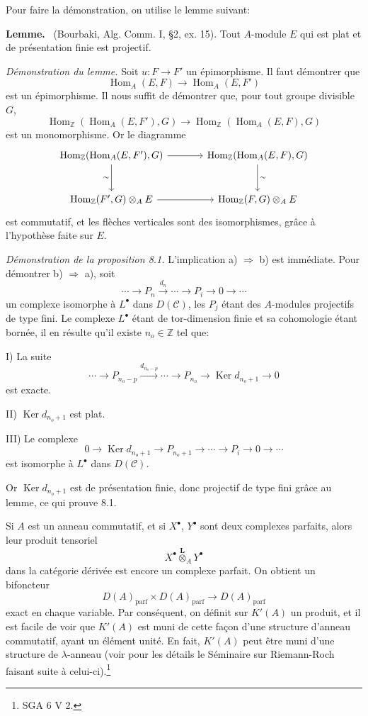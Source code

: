 \documentclass[11pt]{article}
\newenvironment{statement}[1]{\par\medskip\noindent\textbf{#1.}\ }{\par\medskip}
\DeclareMathOperator{\Hom}{Hom}
\providecommand{\Ker}{\operatorname{Ker}}
\providecommand{\parf}{\mathrm{parf}}
\providecommand{\Hom}{\operatorname{Hom}}
\providecommand{\cC}{\mathcal C}
\providecommand{\Ker}{\operatorname{Ker}}
\providecommand{\Ker}{\operatorname{Ker}}
\providecommand{\cC}{\mathcal C}
\providecommand{\parf}{\mathrm{parf}}
\providecommand{\Hom}{\operatorname{Hom}}
\begin{document}
Pour faire la démonstration, on utilise le lemme suivant:

\begin{statement}{Lemme}
(Bourbaki, Alg. Comm. I, §2, ex. 15). Tout $A$-module $E$ qui est plat et de présentation finie est projectif.
\end{statement}

\emph{Démonstration du lemme.} Soit $u:F\to F'$ un épimorphisme. Il faut démontrer que
\[
\Hom_A(E,F)\longrightarrow\Hom_A(E,F')
\]
est un épimorphisme. Il nous suffit de démontrer que, pour tout groupe divisible $G$,
\[
\Hom_{\mathbb Z}(\Hom_A(E,F'),G)\longrightarrow
\Hom_{\mathbb Z}(\Hom_A(E,F),G)
\]
est un monomorphisme. Or le diagramme
\[
\begin{tikzcd}[column sep=large,row sep=large]
\Hom_{\mathbb Z}(\Hom_A(E,F'),G)
 \arrow[r]\arrow[d,"\sim"']&
\Hom_{\mathbb Z}(\Hom_A(E,F),G)\arrow[d,"\sim"]\\
\Hom_{\mathbb Z}(F',G)\otimes_A E
 \arrow[r]&
\Hom_{\mathbb Z}(F,G)\otimes_A E
\end{tikzcd}
\]
est commutatif, et les flèches verticales sont des isomorphismes, grâce à l'hypothèse faite sur $E$.

\emph{Démonstration de la proposition 8.1.} L'implication a) $\Rightarrow$ b) est immédiate. Pour démontrer b) $\Rightarrow$ a), soit
\[
\cdots\longrightarrow P_n\xrightarrow{d_n}\cdots\longrightarrow P_i\longrightarrow 0\longrightarrow\cdots
\]
un complexe isomorphe à $L^\bullet$ dans $D(\cC)$, les $P_j$ étant des $A$-modules projectifs de type fini. Le complexe $L^\bullet$ étant de tor-dimension finie et sa cohomologie étant bornée, il en résulte qu'il existe $n_o\in\mathbb Z$ tel que:

I) La suite
\[
\cdots\longrightarrow P_{n_o-p}\xrightarrow{d_{n_o-p}}\cdots\longrightarrow
P_{n_o}\longrightarrow \Ker d_{n_o+1}\longrightarrow0
\]
est exacte.

II) $\Ker d_{n_o+1}$ est plat.

III) Le complexe
\[
0\longrightarrow \Ker d_{n_o+1}\longrightarrow P_{n_o+1}\longrightarrow\cdots\longrightarrow P_i\longrightarrow0\longrightarrow\cdots
\]
est isomorphe à $L^\bullet$ dans $D(\cC)$.

Or $\Ker d_{n_o+1}$ est de présentation finie, donc projectif de type fini grâce au lemme, ce qui prouve 8.1.

Si $A$ est un anneau commutatif, et si $X^\bullet$, $Y^\bullet$ sont deux complexes parfaits, alors leur produit tensoriel
\[
X^\bullet\overset{\mathbf L}{\otimes}_A Y^\bullet
\]
dans la catégorie dérivée est encore un complexe parfait. On obtient un bifoncteur
\[
D(A)_{\parf}\times D(A)_{\parf}\longrightarrow D(A)_{\parf}
\]
exact en chaque variable. Par conséquent, on définit sur $K'(A)$ un produit, et il est facile de voir que $K'(A)$ est muni de cette façon d'une structure d'anneau commutatif, ayant un élément unité. En fait, $K'(A)$ peut être muni d'une structure de $\lambda$-anneau (voir pour les détails le Séminaire sur Riemann-Roch faisant suite à celui-ci).\footnote{SGA 6 V 2.}
\end{document}
